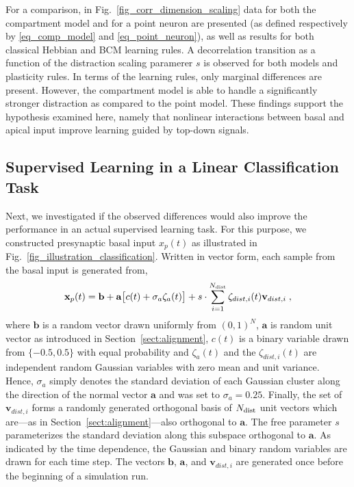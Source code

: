\documentclass[utf8]{frontiersSCNS} %
\begin{document}
For a comparison, in 
Fig.~\ref{fig_corr_dimension_scaling}
data for both the compartment model
and for a point neuron are presented
(as defined respectively by \eqref{eq_comp_model}
and \eqref{eq_point_neuron}), as well as results for both 
classical Hebbian and BCM learning rules. A decorrelation 
transition as a function of the distraction 
scaling paramerer $s$ is observed for both 
models and plasticity rules. In terms of the learning rules,
only marginal differences are present. 
However, the compartment model is able
to handle a significantly stronger distraction 
as compared to the point model. These findings
support the hypothesis examined here, namely
that nonlinear interactions between basal and 
apical input improve learning guided by top-down signals.

\subsection{Supervised Learning in a Linear Classification Task}
\label{sect:classification}

Next, we investigated if the observed differences would also improve
the performance in an actual supervised learning task.
For this purpose, we constructed presynaptic basal 
input $x_p(t)$ as illustrated in 
Fig.~\ref{fig_illustration_classification}.
Written in vector form, each sample from the basal 
input is generated from,
\begin{equation}
\mathbf{x}_p(t) = \mathbf{b} + 
\mathbf{a}\big[c(t) + \sigma_a \zeta_a(t) \big] 
+ s \cdot \sum_{i=1}^{N_{\rm dist}} 
\zeta_{dist,i}(t) \mathbf{v}_{dist,i} \; ,
\end{equation}
where $\mathbf{b}$ is a random vector drawn uniformly from
$(0,1)^N$, $\mathbf{a}$ is random unit vector as introduced in 
Section~\ref{sect:alignment}, $c(t)$ is a binary variable drawn 
from $\{-0.5,0.5\}$ with equal probability and $\zeta_a(t)$ and the
$\zeta_{dist,i}(t)$ are independent random Gaussian variables with 
zero mean and unit variance. 
Hence, $\sigma_a$ simply denotes the standard deviation of each Gaussian
cluster along the direction of the normal vector $\mathbf{a}$ and was
set to $\sigma_a = 0.25$. 
Finally, the set of $\mathbf{v}_{dist,i}$ forms a 
randomly generated orthogonal basis of $N_{\rm dist}$ 
unit vectors which are---as in 
Section~\ref{sect:alignment}---also orthogonal to 
$\mathbf{a}$. The free parameter $s$ parameterizes
the standard deviation along this subspace orthogonal 
to $\mathbf{a}$. As indicated by the time dependence, 
the Gaussian and binary random variables are drawn 
for each time step. The vectors $\mathbf{b}$, 
$\mathbf{a}$, and $\mathbf{v}_{dist,i}$ are generated
once before the beginning of a simulation run.
\end{document}
